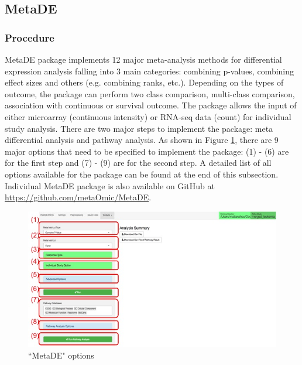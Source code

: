 \subsection{MetaDE}

\subsubsection{Procedure}

MetaDE package implements 12 major meta-analysis methods for differential expression analysis falling into 3 main categories: combining p-values, combining effect sizes and others (e.g. combining ranks, etc.). Depending on the types of outcome, the package can perform two class comparison, multi-class comparison, association with continuous or survival outcome. The package allows the input of either microarray (continuous intensity) or RNA-seq data (count) for individual study analysis. There are two major steps to implement the package: meta differential analysis and pathway analysis. As shown in Figure \ref{fig:MetaDEoption}, there are 9 major options that need to be specified to implement the package: (1) - (6) are for the first step and (7) - (9) are for the second step. A detailed list of all options available for the package can be found at the end of this subsection. Individual MetaDE package is also available on GitHub at \url{https://github.com/metaOmic/MetaDE}. \\

\begin{figure}[H]
\begin{center}
\includegraphics[scale=0.45]{./figure/metaDE/metaDEoption.jpg}
\caption{``MetaDE" options}
\label{fig:MetaDEoption}
\end{center}
\end{figure}

